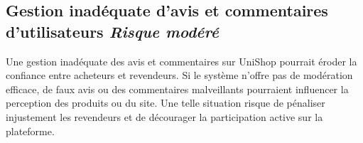 \documentclass[16pt]{report}
\begin{document}
\subsection*{Gestion inadéquate d'avis et commentaires d'utilisateurs \textcolor{myb}{\textit{Risque modéré}}}
Une gestion inadéquate des avis et commentaires sur UniShop pourrait éroder la confiance entre acheteurs et revendeurs.
Si le système n'offre pas de modération efficace, de faux avis ou des commentaires malveillants pourraient influencer 
la perception des produits ou du site. Une telle situation risque de pénaliser injustement les revendeurs et de 
décourager la participation active sur la plateforme.
\end{document}
